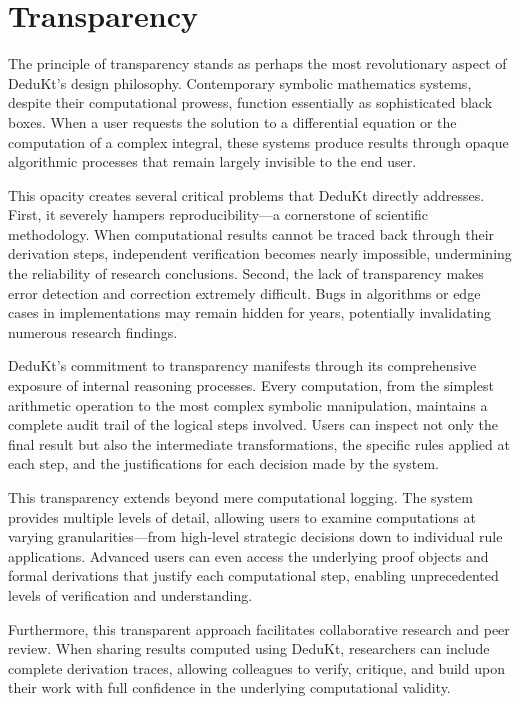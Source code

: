 \section{Transparency}\label{sec:transparency}

The principle of transparency stands as perhaps the most revolutionary aspect of DeduKt's design philosophy.
Contemporary symbolic mathematics systems, despite their computational prowess, function essentially as sophisticated black boxes.
When a user requests the solution to a differential equation or the computation of a complex integral, these systems produce results through opaque algorithmic processes that remain largely invisible to the end user.

This opacity creates several critical problems that DeduKt directly addresses.
First, it severely hampers reproducibility—a cornerstone of scientific methodology.
When computational results cannot be traced back through their derivation steps, independent verification becomes nearly impossible, undermining the reliability of research conclusions.
Second, the lack of transparency makes error detection and correction extremely difficult.
Bugs in algorithms or edge cases in implementations may remain hidden for years, potentially invalidating numerous research findings.

DeduKt's commitment to transparency manifests through its comprehensive exposure of internal reasoning processes.
Every computation, from the simplest arithmetic operation to the most complex symbolic manipulation, maintains a complete audit trail of the logical steps involved.
Users can inspect not only the final result but also the intermediate transformations, the specific rules applied at each step, and the justifications for each decision made by the system.

This transparency extends beyond mere computational logging.
The system provides multiple levels of detail, allowing users to examine computations at varying granularities—from high-level strategic decisions down to individual rule applications.
Advanced users can even access the underlying proof objects and formal derivations that justify each computational step, enabling unprecedented levels of verification and understanding.

Furthermore, this transparent approach facilitates collaborative research and peer review.
When sharing results computed using DeduKt, researchers can include complete derivation traces, allowing colleagues to verify, critique, and build upon their work with full confidence in the underlying computational validity.


